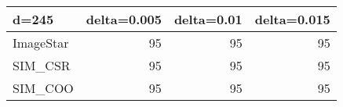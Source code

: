 \begin{tabular}{lrrr}
\hline
 d=245     &   delta=0.005 &   delta=0.01 &   delta=0.015 \\
\hline
 ImageStar &            95 &           95 &            95 \\
 SIM\_CSR   &            95 &           95 &            95 \\
 SIM\_COO   &            95 &           95 &            95 \\
\hline
\end{tabular}
